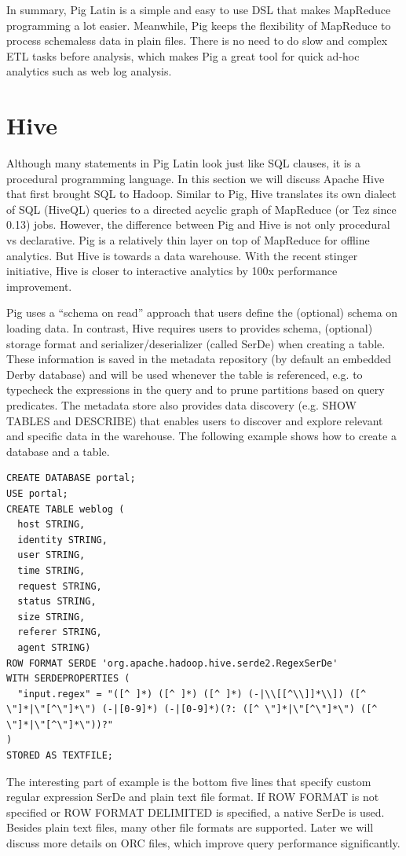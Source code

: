 \documentclass[12pt]{book}
\begin{document}
In summary, Pig Latin is a simple and easy to use DSL that makes MapReduce programming a lot easier. Meanwhile, Pig keeps the flexibility of MapReduce to process schemaless data in plain files. There is no need to do slow and complex ETL tasks before analysis, which makes Pig a great tool for quick ad-hoc analytics such as web log analysis.

\section{Hive}
Although many statements in Pig Latin look just like SQL clauses, it is a procedural programming language. In this section we will discuss Apache Hive that first brought SQL to Hadoop. Similar to Pig, Hive translates its own dialect of SQL (HiveQL) queries to a directed acyclic graph of MapReduce (or Tez since 0.13) jobs. However, the difference between Pig and Hive is not only procedural vs declarative. Pig is a relatively thin layer on top of MapReduce for offline analytics. But Hive is towards a data warehouse. With the recent stinger initiative, Hive is closer to interactive analytics by 100x performance improvement.

Pig uses a ``schema on read'' approach that users define the (optional) schema on loading data. In contrast, Hive requires users to provides schema, (optional) storage format and serializer/deserializer (called SerDe) when creating a table. These information is saved in the metadata repository (by default an embedded Derby database) and will be used whenever the table is referenced, e.g. to typecheck the expressions in the query and to prune partitions based on query predicates. The metadata store also provides data discovery (e.g. SHOW TABLES and DESCRIBE) that enables users to discover and explore relevant and specific data in the warehouse. The following example shows how to create a database and a table.

\begin{lstlisting}
CREATE DATABASE portal;
USE portal;
CREATE TABLE weblog (
  host STRING,
  identity STRING,
  user STRING,
  time STRING,
  request STRING,
  status STRING,
  size STRING,
  referer STRING,
  agent STRING)
ROW FORMAT SERDE 'org.apache.hadoop.hive.serde2.RegexSerDe'
WITH SERDEPROPERTIES (
  "input.regex" = "([^ ]*) ([^ ]*) ([^ ]*) (-|\\[[^\\]]*\\]) ([^ \"]*|\"[^\"]*\") (-|[0-9]*) (-|[0-9]*)(?: ([^ \"]*|\"[^\"]*\") ([^ \"]*|\"[^\"]*\"))?"
)
STORED AS TEXTFILE;
\end{lstlisting}
The interesting part of example is the bottom five lines that specify custom regular expression SerDe and plain text file format. If ROW FORMAT is not specified or ROW FORMAT DELIMITED is specified, a native SerDe is used. Besides plain text files, many other file formats are supported. Later we will discuss more details on ORC files, which improve query performance significantly.
\end{document}
